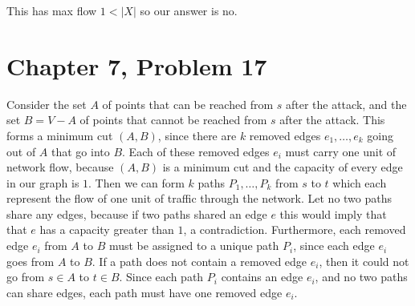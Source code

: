 \documentclass[12pt]{article}
\begin{document}
\begin{center}
\end{center}
This has max flow \(1<|X|\) so our answer is no.

\pagebreak

\section*{Chapter 7, Problem 17}

Consider the set \(A\) of points that can be reached from \(s\) after the attack, and the set \(B=V-A\) of points that cannot be reached from \(s\) after
the attack. This forms a minimum cut \((A,B)\), since there are \(k\) removed edges \(e_1,\ldots,e_k\) going out of \(A\) that go into \(B\). Each of these
removed edges \(e_i\) must carry one unit of network flow, because \((A,B)\) is a minimum cut and the capacity of every edge in our graph is \(1\). Then we
can form \(k\) paths \(P_1,\ldots,P_k\) from \(s\) to \(t\) which each represent the flow of one unit of traffic through the network. Let no two paths share
any edges, because if two paths shared an edge \(e\) this would imply that that \(e\) has a capacity greater than \(1\), a contradiction. Furthermore, each
removed edge \(e_i\) from \(A\) to \(B\) must be assigned to a unique path \(P_i\), since each edge \(e_i\) goes from \(A\) to \(B\). If a path does not
contain a removed edge \(e_i\), then it could not go from \(s\in A\) to \(t\in B\). Since each path \(P_i\) contains an edge \(e_i\), and no two paths can share
edges, each path must have one removed edge \(e_i\).
\end{document}
